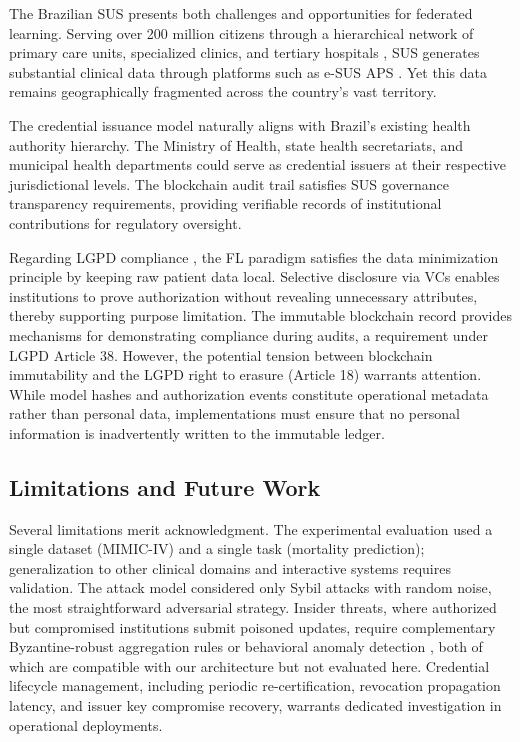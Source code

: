 \documentclass[english]{sbc2025}
\begin{document}
The Brazilian SUS presents both challenges and opportunities for federated learning. Serving over 200 million citizens through a hierarchical network of primary care units, specialized clinics, and tertiary hospitals \citep{paim2011brazilian}, SUS generates substantial clinical data through platforms such as e-SUS APS \citep{Lacerda2020}. Yet this data remains geographically fragmented across the country's vast territory.

The credential issuance model naturally aligns with Brazil's existing health authority hierarchy. The Ministry of Health, state health secretariats, and municipal health departments could serve as credential issuers at their respective jurisdictional levels. The blockchain audit trail satisfies SUS governance transparency requirements, providing verifiable records of institutional contributions for regulatory oversight.

Regarding LGPD compliance \citep{LGPD}, the FL paradigm satisfies the data minimization principle by keeping raw patient data local. Selective disclosure via VCs enables institutions to prove authorization without revealing unnecessary attributes, thereby supporting purpose limitation. The immutable blockchain record provides mechanisms for demonstrating compliance during audits, a requirement under LGPD Article 38. However, the potential tension between blockchain immutability and the LGPD right to erasure (Article 18) warrants attention. While model hashes and authorization events constitute operational metadata rather than personal data, implementations must ensure that no personal information is inadvertently written to the immutable ledger.

\subsection{Limitations and Future Work}

Several limitations merit acknowledgment. The experimental evaluation used a single dataset (MIMIC-IV) and a single task (mortality prediction); generalization to other clinical domains and interactive systems requires validation. The attack model considered only Sybil attacks with random noise, the most straightforward adversarial strategy. Insider threats, where authorized but compromised institutions submit poisoned updates, require complementary Byzantine-robust aggregation rules \citep{11230563, 10.1145/3658644.3670307} or behavioral anomaly detection \citep{WANG2025126354}, both of which are compatible with our architecture but not evaluated here. Credential lifecycle management, including periodic re-certification, revocation propagation latency, and issuer key compromise recovery, warrants dedicated investigation in operational deployments.
\end{document}
